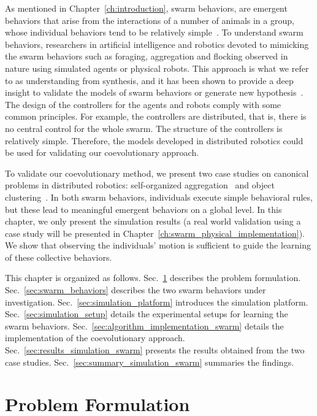 As mentioned in Chapter~\ref{ch:introduction}, swarm behaviors, are emergent behaviors that arise from the interactions of a number of animals in a group, whose individual behaviors tend to be relatively simple~\cite{Camazine2001}. To understand swarm behaviors, researchers in artificial intelligence and robotics devoted to mimicking the swarm behaviors such as foraging, aggregation and flocking observed in nature using simulated agents or physical robots. This approach is what we refer to as understanding from synthesis, and it has been shown to provide a deep insight to validate the models of swarm behaviors or generate new hypothesis~\cite{J.Halloy2007}. The design of the controllers for the agents and robots comply with some common principles. For example, the controllers are distributed, that is, there is no central control for the whole swarm. The structure of the controllers is relatively simple. Therefore, the models developed in distributed robotics could be used for validating our coevolutionary approach.

To validate our coevolutionary method, we present two case studies on canonical problems in distributed robotics: self-organized aggregation~\cite{Gauci2014_ijrr} and object clustering~\cite{Melvin2014_aamas}. In both swarm behaviors, individuals execute simple behavioral rules, but these lead to meaningful emergent behaviors on a global level. In this chapter, we only present the simulation results (a real world validation using a case study will be presented in Chapter~\ref{ch:swarm_physical_implementation}). We show that observing the individuals' motion is sufficient to guide the learning of these collective behaviors. 

This chapter is organized as follows. Sec.~\ref{sec:problem_formulation} describes the problem formulation. Sec.~\ref{sec:swarm_behaviors} describes the two swarm behaviors under investigation. Sec.~\ref{sec:simulation_platform} introduces the simulation platform. Sec.~\ref{sec:simulation_setup} details the experimental setups for learning the swarm behaviors. Sec.~\ref{sec:algorithm_implementation_swarm} details the implementation of the coevolutionary approach. Sec.~\ref{sec:results_simulation_swarm} presents the results obtained from the two case studies. Sec.~\ref{sec:summary_simulation_swarm} summaries the findings.

\section{Problem Formulation}\label{sec:problem_formulation}

